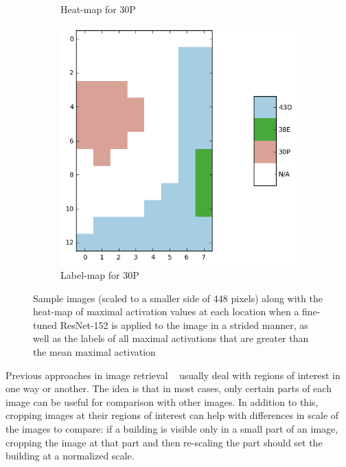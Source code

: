 \begin{figure}
\begin{subfigure}[b]{0.3\textwidth}
\caption{Heat-map for 30P\label{fig:sample3_hm}}
\end{subfigure}
\begin{subfigure}[b]{0.3\textwidth}
\includegraphics[width=\textwidth]{img/sample3_labels.png}
\caption{Label-map for 30P\label{fig:sample3_lab}}
\end{subfigure}
\caption{Sample images (scaled to a smaller side of 448 pixels)
along with the heat-map of maximal activation values
at each location when a fine-tuned ResNet-152 is applied to the image in a
strided manner, as well as the labels of all maximal activations that are
greater than the mean maximal activation\label{fig:heatmaps}}
\end{figure}

Previous approaches in image retrieval
~\cite{gordo_end--end_2017,salvador_faster_2016,tolias_particular_2015}
usually deal with regions of interest in one way or another.
The idea is that in most cases, only certain parts of each image can
be useful for comparison with other images. In addition to this,
cropping images at their regions of interest can help with differences
in scale of the images to compare: if a building is visible only in a small
part of an image, cropping the image at that part and then re-scaling
the part should set the building at a normalized scale.

